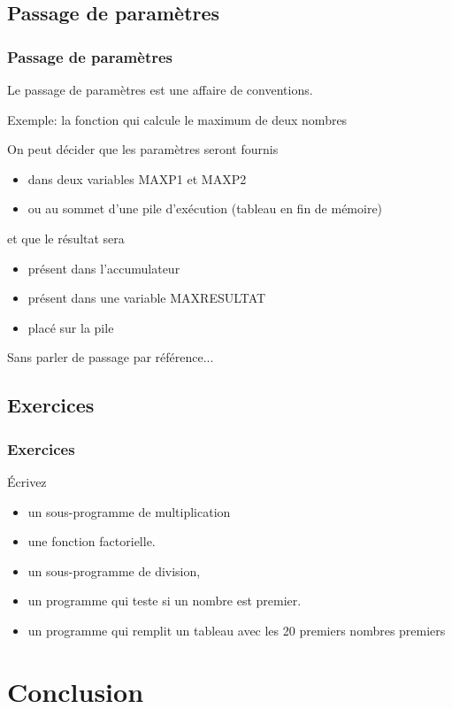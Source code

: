 \subsection{Passage de paramètres}

\begin{frame}
\frametitle{Passage de paramètres}

\alert{Le passage de paramètres est une affaire de conventions.}

\alert{Exemple}: la fonction qui calcule le maximum de deux nombres

On peut décider que les paramètres seront fournis
\begin{itemize}
\item  dans deux variables MAXP1 et MAXP2
\item ou au sommet d'une pile d'exécution (tableau en fin de mémoire)
\end{itemize}

et que le résultat sera
\begin{itemize}
\item présent dans l'accumulateur
\item présent dans une variable MAXRESULTAT
\item placé sur la pile
\end{itemize}

Sans parler de passage par référence...
\end{frame}

\subsection{Exercices}
\begin{frame}
\frametitle{Exercices}
Écrivez 
\begin{itemize}
\item un sous-programme de multiplication
\item une fonction factorielle.
\item un sous-programme de division, 
\item un programme qui teste si un nombre est premier.
\item un programme qui remplit un tableau avec les 20 premiers nombres
premiers
\end{itemize}
\end{frame}

\section{Conclusion}

